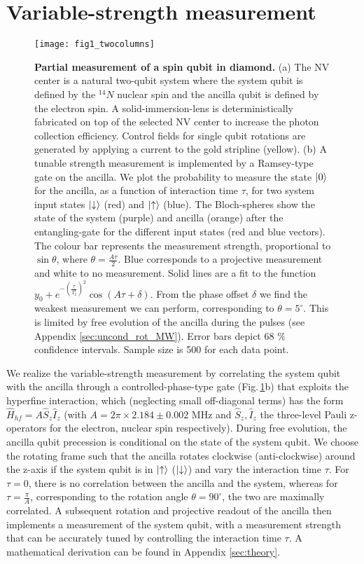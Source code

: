 \section{Variable-strength measurement}
\begin{figure*}
	\centering
	\texttt{[image: fig1\_twocolumns]}
	\caption{\label{fig:amc-fig1} \textbf{Partial measurement of a spin qubit in diamond.} (a) The NV center is a natural two-qubit system where the system qubit is defined by the $^{14}N$ nuclear spin and the ancilla qubit is defined by the electron spin. A solid-immersion-lens is deterministically fabricated on top of the selected NV center to increase the photon collection efficiency. Control fields for single qubit rotations are generated by applying a current to the gold stripline (yellow).  (b) A tunable strength measurement is implemented by a Ramsey-type gate on the ancilla. We plot the probability to measure the state $\left|0\right>$  for the ancilla, as a function of interaction time $\tau$, for two system input states $\left|\downarrow\right>$ (red) and $\left|\uparrow\right>$ (blue). The Bloch-spheres show the state of the system (purple) and ancilla (orange) after the entangling-gate for the different input states (red and blue vectors). The colour bar represents the measurement strength, proportional to $\sin{\theta}$, where $\theta=\frac{A \tau}{2}$. Blue corresponds to a projective measurement and white to no measurement. Solid lines are a  fit to the function $y_0 + e^{-( \frac{\tau}{T_2^*})^2} \cos{(A \tau + \delta)} $. From the phase offset $\delta$ we find the weakest measurement we can perform, corresponding to $\theta = 5^{\circ}$. This is limited by free evolution of the ancilla during the pulses (see Appendix \ref{sec:uncond_rot_MW}). Error bars depict 68 $\%$ confidence intervals. Sample size is 500 for each data point. }
\end{figure*}

We realize the variable-strength measurement by correlating the system qubit with the ancilla through a controlled-phase-type gate (Fig.\,\ref{fig:amc-fig1}b) that exploits the hyperfine interaction, which (neglecting small off-diagonal terms) has the form $\hat{H}_{hf}=A\hat{S}_{z}\hat{I}_{z}$ (with $A = 2 \pi \times 2.184 \pm 0.002$ MHz and $\hat{S}_{z}, \hat{I}_{z}$ the three-level Pauli z-operators for the electron, nuclear spin respectively).  During free evolution, the ancilla qubit precession is conditional on the state of the system qubit. We choose the rotating frame such that the ancilla rotates clockwise (anti-clockwise) around the z-axis if the system qubit is in $\left|\uparrow\right>$ ($\left|\downarrow\right>$) and vary the interaction time $\tau$. For $\tau = 0$, there is no correlation between the ancilla and the system, whereas for $\tau = \frac{\pi}{A}$, corresponding to the rotation angle $\theta = 90^{\circ}$, the two are maximally correlated. A subsequent rotation and projective readout of the ancilla then implements a measurement of the system qubit, with a measurement strength that can be accurately tuned by controlling the interaction time $\tau$. A mathematical derivation can be found in Appendix \ref{sec:theory}.

